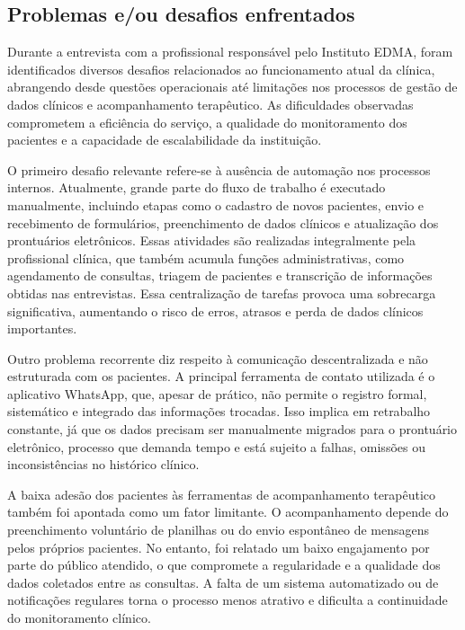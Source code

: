 \href{}{}\documentclass[12pt,portuguese,oneside]{article}
\begin{document}
\subsection{Problemas e/ou desafios enfrentados}
\hspace{1em}Durante a entrevista com a profissional responsável pelo Instituto EDMA, foram identificados diversos desafios relacionados ao funcionamento atual da clínica, abrangendo desde questões operacionais até limitações nos processos de gestão de dados clínicos e acompanhamento terapêutico. As dificuldades observadas comprometem a eficiência do serviço, a qualidade do monitoramento dos pacientes e a capacidade de escalabilidade da instituição.

O primeiro desafio relevante refere-se à ausência de automação nos processos internos. Atualmente, grande parte do fluxo de trabalho é executado manualmente, incluindo etapas como o cadastro de novos pacientes, envio e recebimento de formulários, preenchimento de dados clínicos e atualização dos prontuários eletrônicos. Essas atividades são realizadas integralmente pela profissional clínica, que também acumula funções administrativas, como agendamento de consultas, triagem de pacientes e transcrição de informações obtidas nas entrevistas. Essa centralização de tarefas provoca uma sobrecarga significativa, aumentando o risco de erros, atrasos e perda de dados clínicos importantes.

Outro problema recorrente diz respeito à comunicação descentralizada e não estruturada com os pacientes. A principal ferramenta de contato utilizada é o aplicativo WhatsApp, que, apesar de prático, não permite o registro formal, sistemático e integrado das informações trocadas. Isso implica em retrabalho constante, já que os dados precisam ser manualmente migrados para o prontuário eletrônico, processo que demanda tempo e está sujeito a falhas, omissões ou inconsistências no histórico clínico.

A baixa adesão dos pacientes às ferramentas de acompanhamento terapêutico também foi apontada como um fator limitante. O acompanhamento depende do preenchimento voluntário de planilhas ou do envio espontâneo de mensagens pelos próprios pacientes. No entanto, foi relatado um baixo engajamento por parte do público atendido, o que compromete a regularidade e a qualidade dos dados coletados entre as consultas. A falta de um sistema automatizado ou de notificações regulares torna o processo menos atrativo e dificulta a continuidade do monitoramento clínico.
\end{document}

